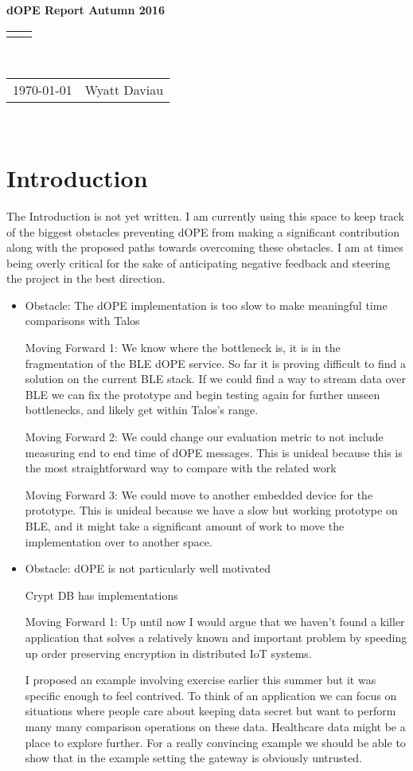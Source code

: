 \documentclass[12pt]{article}
\renewcommand{\title}[1]{\textbf{#1}\\}
\renewcommand{\line}{\begin{tabularx}{\textwidth}{X>{\raggedleft}X}\hline\\\end{tabularx}\\[-0.5cm]}
\newcommand{\leftright}[2]{\begin{tabularx}{\textwidth}{X>{\raggedleft}X}#1%
& #2\\\end{tabularx}\\[-0.5cm]}
\begin{document}
\title{dOPE Report Autumn 2016}
\line
\leftright{\today}{Wyatt Daviau} %

\section{Introduction}

The Introduction is not yet written.  I am currently using this space to keep track of the biggest obstacles preventing dOPE from making a significant contribution along with the proposed paths towards overcoming these obstacles.  I am at times being overly critical for the sake of anticipating negative feedback and steering the project in the best direction.

\begin{itemize}
\item
Obstacle: The dOPE implementation is too slow to make meaningful time comparisons with Talos

Moving Forward 1: We know where the bottleneck is, it is in the fragmentation of the BLE dOPE service.  So far it is proving difficult to find a solution on the current BLE stack.  If we could find a way to stream data over BLE we can fix the prototype and begin testing again for further unseen bottlenecks, and likely get within Talos's range.

Moving Forward 2: We could change our evaluation metric to not include measuring end to end time of dOPE messages.  This is unideal because this is the most straightforward way to compare with the related work

Moving Forward 3: We could move to another embedded device for the prototype.  This is unideal because we have a slow but working prototype on BLE, and it might take a significant amount of work to move the implementation over to another space.

\item
Obstacle: dOPE is not particularly well motivated

Crypt DB has implementations

Moving Forward 1: Up until now I would argue that we haven't found a killer application that solves a relatively known and important problem by speeding up order preserving encryption in distributed IoT systems.  

I proposed an example involving exercise earlier this summer but it was specific enough to feel contrived.  To think of an application we can focus on situations where people care about keeping data secret but want to perform many many comparison operations on these data.  Healthcare data might be a place to explore further.  For a really convincing example we should be able to show that in the example setting the gateway is obviously untrusted.


\end{itemize}
\end{document}
